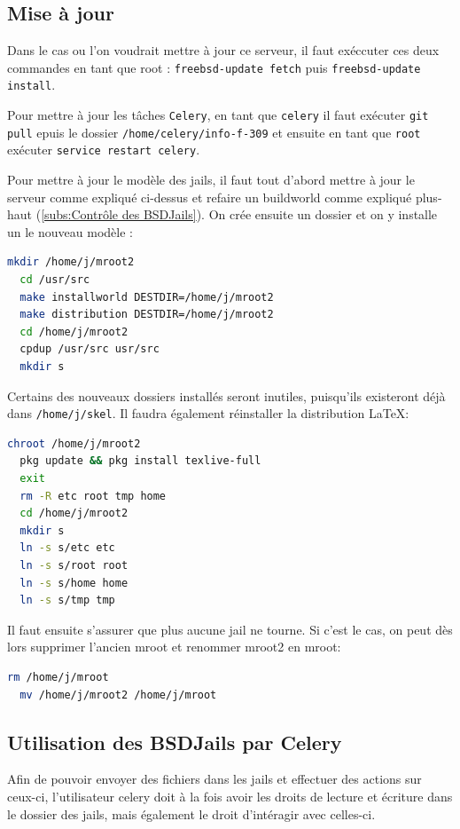 \documentclass[10pt,a4paper]{article}
\begin{document}
\subsection{Mise à jour}

Dans le cas ou l'on voudrait mettre à jour ce serveur,
il faut exéccuter ces deux commandes en tant que root :
\texttt{freebsd-update fetch} puis \texttt{freebsd-update install}.

Pour mettre à jour les tâches \texttt{Celery},
en tant que \texttt{celery} il faut exécuter \texttt{git pull}
epuis le dossier \texttt{/home/celery/info-f-309}
et ensuite en tant que \texttt{root} exécuter \texttt{service restart celery}.

Pour mettre à jour le modèle des jails, il faut tout d'abord mettre à jour le serveur comme expliqué ci-dessus et refaire un buildworld comme expliqué plus-haut (\ref{subs:Contrôle des BSDJails}). On crée ensuite un dossier et on y installe un le nouveau modèle :
\begin{lstlisting}[language=bash]
  mkdir /home/j/mroot2
  cd /usr/src
  make installworld DESTDIR=/home/j/mroot2
  make distribution DESTDIR=/home/j/mroot2
  cd /home/j/mroot2
  cpdup /usr/src usr/src
  mkdir s
\end{lstlisting}
Certains des nouveaux dossiers installés seront inutiles, puisqu'ils existeront déjà dans \texttt{/home/j/skel}. Il faudra également réinstaller la distribution \LaTeX :
\begin{lstlisting}[language=bash]
  chroot /home/j/mroot2
  pkg update && pkg install texlive-full
  exit
  rm -R etc root tmp home
  cd /home/j/mroot2
  mkdir s
  ln -s s/etc etc
  ln -s s/root root
  ln -s s/home home
  ln -s s/tmp tmp
\end{lstlisting}
Il faut ensuite s'assurer que plus aucune jail ne tourne. Si c'est le cas, on peut dès lors supprimer l'ancien mroot et renommer mroot2 en mroot:
\begin{lstlisting}[language=bash]
  rm /home/j/mroot
  mv /home/j/mroot2 /home/j/mroot
\end{lstlisting}

\subsection{Utilisation des BSDJails par Celery}
Afin de pouvoir envoyer des fichiers dans les jails et effectuer des actions sur ceux-ci, l'utilisateur celery doit à la fois avoir les droits de lecture et écriture dans le dossier des jails, mais également le droit d'intéragir avec celles-ci.
\end{document}
